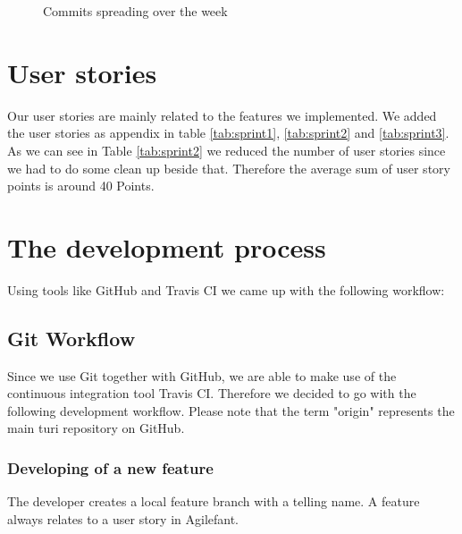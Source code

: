 \documentclass[a4paper]{article}
\begin{document}
\begin{figure}[!htb]
  \begin{center}
    \caption{Commits spreading over the week}
    \label{fig:commitfrequency}
  \end{center}
\end{figure}

\section{User stories}
Our user stories are mainly related to the features we implemented. We added the user stories as appendix in table \ref{tab:sprint1}, \ref{tab:sprint2} and \ref{tab:sprint3}. As we can see in Table \ref{tab:sprint2} we reduced the number of user stories since we had to do some clean up beside that. Therefore the average sum of user story points is around 40 Points.

\section{The development process}

Using tools like GitHub and Travis CI we came up with the following workflow:

\subsection{Git Workflow}
Since we use Git together with GitHub, we are able to make use of the continuous integration tool Travis CI. Therefore we decided to go with the following development workflow. Please note that the term "origin" represents the main turi repository on GitHub.

\subsubsection{Developing of a new feature}
The developer creates a local feature branch with a telling name. A feature always relates to a user story in Agilefant.
\end{document}
